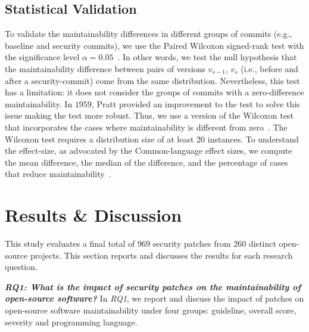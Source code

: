 \documentclass[smallextended]{svjour3}       %
\begin{document}
\subsection{Statistical Validation}\label{sec:statsval}
%
To validate the maintainability differences in different groups of 
commits (e.g., baseline and security commits), we use the Paired 
Wilcoxon signed-rank test with the significance level $\alpha = 
0.05$~\cite{10.2307/3001968}. In other words, we test the null 
hypothesis that the maintainability difference between pairs of 
versions $v_{s-1}$, $v_s$ (i.e., before and after a security-commit) 
come from the same distribution. Nevertheless, this test 
has a limitation: it does not consider the groups of commits with a 
zero-difference maintainability. In $1959$, Pratt provided an 
improvement to the test to solve this issue making the test more 
robust. Thus, we use a version of the Wilcoxon test that 
incorporates the cases where maintainability is different from 
zero~\cite{10.2307/2282543}. The Wilcoxon test requires a 
distribution size of at least $20$ instances. To understand the 
effect-size, as advocated by the Common-language effect 
sizes, we compute the mean difference, the median of 
the difference, and the percentage of cases that reduce 
maintainability~\cite{graw:1992}.
%

\section{Results \& Discussion}\label{sec:results}

This study evaluates a final total of $969$ security patches from $260$ 
distinct open-source projects. This section 
reports and discusses the results for each research question.
%

\textit{\textbf{RQ1: What is the impact of security patches on the
maintainability of open-source software?}} In \emph{RQ1}, we 
report and discuss the impact of patches on open-source software 
maintainability under four groups: guideline, overall score, 
severity and programming language.
\end{document}
